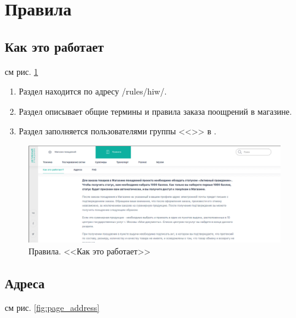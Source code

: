     \section{Правила}
        \subsection{Как это работает}
            \label{sec:rules_hiw}
            
            см рис. \ref{fig:page_hiw}
            
            \begin{enumerate}
                \item Раздел находится по адресу /rules/hiw/.
                \item Раздел описывает общие термины и правила заказа поощрений в магазине.
                \item Раздел заполняется пользователями группы <<>> в .
            \end{enumerate}

        \begin{figure}
            \includegraphics[width=170mm]{02_noauth_funcs/figures/09.eps}
            \caption{Правила. <<Как это работает>>}
            \label{fig:page_hiw}
        \end{figure} 
            
            
        \subsection{Адреса}
            \label{sec:page_address}
            
            см рис. \ref{fig:page_address}
            
